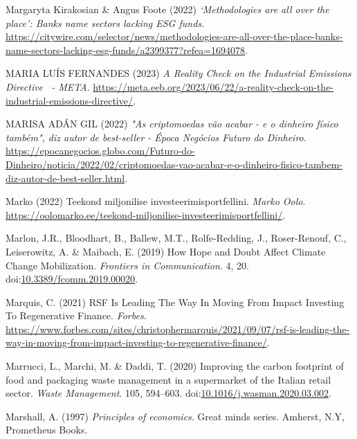 \documentclass[
  letterpaper,
  DIV=11,
  numbers=noendperiod]{scrartcl}
\newlength{\cslhangindent}
\newenvironment{CSLReferences}[2] %
 {\begin{list}{}{%
  \setlength{\itemindent}{0pt}
  \setlength{\leftmargin}{0pt}
  \setlength{\parsep}{0pt}
  \ifodd #1
   \setlength{\leftmargin}{\cslhangindent}
   \setlength{\itemindent}{-1\cslhangindent}
  \fi
  \setlength{\itemsep}{#2\baselineskip}}}
 {\end{list}}
\begin{document}
\begin{CSLReferences}{0}{1}
Margaryta Kirakosian \& Angus Foote (2022) \emph{{`{Methodologies} are
all over the place'}: {Banks} name sectors lacking {ESG} funds}.
\url{https://citywire.com/selector/news/methodologies-are-all-over-the-place-banks-name-sectors-lacking-esg-funds/a2399377?refea=1694078}.

MARIA LUÍS FERNANDES (2023) \emph{A {Reality Check} on the {Industrial
Emissions Directive}~ - {META}}.
\url{https://meta.eeb.org/2023/06/22/a-reality-check-on-the-industrial-emissions-directive/}.

MARISA ADÁN GIL (2022) \emph{"{As} criptomoedas v{ã}o acabar - e o
dinheiro f{í}sico tamb{é}m", diz autor de best-seller - {{É}poca
Neg{ó}cios} {\textbar} {Futuro} do {Dinheiro}}.
\url{https://epocanegocios.globo.com/Futuro-do-Dinheiro/noticia/2022/02/criptomoedas-vao-acabar-e-o-dinheiro-fisico-tambem-diz-autor-de-best-seller.html}.

Marko (2022) Teekond miljonilise investeerimisportfellini. \emph{Marko
Oolo}.
\url{https://oolomarko.ee/teekond-miljonilise-investeerimisportfellini/}.

Marlon, J.R., Bloodhart, B., Ballew, M.T., Rolfe-Redding, J.,
Roser-Renouf, C., Leiserowitz, A. \& Maibach, E. (2019) How {Hope} and
{Doubt Affect Climate Change Mobilization}. \emph{Frontiers in
Communication}. 4, 20.
doi:\href{https://doi.org/10.3389/fcomm.2019.00020}{10.3389/fcomm.2019.00020}.

Marquis, C. (2021) {RSF Is Leading The Way In Moving From Impact
Investing To Regenerative Finance}. \emph{Forbes}.
\url{https://www.forbes.com/sites/christophermarquis/2021/09/07/rsf-is-leading-the-way-in-moving-from-impact-investing-to-regenerative-finance/}.

Marrucci, L., Marchi, M. \& Daddi, T. (2020) Improving the carbon
footprint of food and packaging waste management in a supermarket of the
{Italian} retail sector. \emph{Waste Management}. 105, 594--603.
doi:\href{https://doi.org/10.1016/j.wasman.2020.03.002}{10.1016/j.wasman.2020.03.002}.

Marshall, A. (1997) \emph{Principles of economics}. Great minds series.
Amherst, N.Y, Prometheus Books.


\end{CSLReferences}
\end{document}
